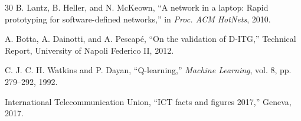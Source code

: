 \documentclass[journal]{IEEEtran}
\begin{document}
\begin{thebibliography}{30}
 B. Lantz, B. Heller, and N. McKeown, ``A network in a
laptop: Rapid prototyping for software-defined networks,'' in \emph{Proc.
ACM HotNets}, 2010.

 A. Botta, A. Dainotti, and A. Pescap\'e, ``On the
validation of D-ITG,'' Technical Report, University of Napoli Federico II,
2012.

 C. J. C. H. Watkins and P. Dayan, ``Q-learning,''
\emph{Machine Learning}, vol. 8, pp. 279--292, 1992.

 International Telecommunication Union, ``ICT facts and
figures 2017,'' Geneva, 2017.

\end{thebibliography}
\end{document}
